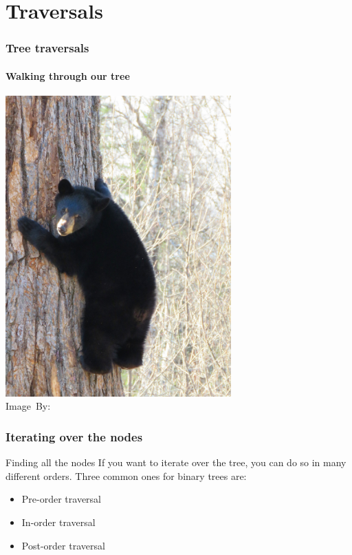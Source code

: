 \section{Traversals}
\label{sec:traversals}

\begin{frame}
	\frametitle{Tree traversals}
	\framesubtitle{Walking through our tree}

	\begin{center}
		\includegraphics[trim={0 4cm 0 4cm},clip, width=0.65\textwidth]{figures/bearcub.jpg}\\
		\hspace*{15pt}\hbox{\scriptsize Image By:}
	\end{center}

\end{frame}

\begin{frame}
	\frametitle{Iterating over the nodes}
	
		\begin{block}{Finding all the nodes}
			If you want to iterate over the tree, you can do so in many different orders. Three common ones for binary trees are:
			\begin{itemize}
				\item Pre-order traversal
				\item In-order traversal
				\item Post-order traversal
			\end{itemize}
		\end{block}	
\end{frame}

